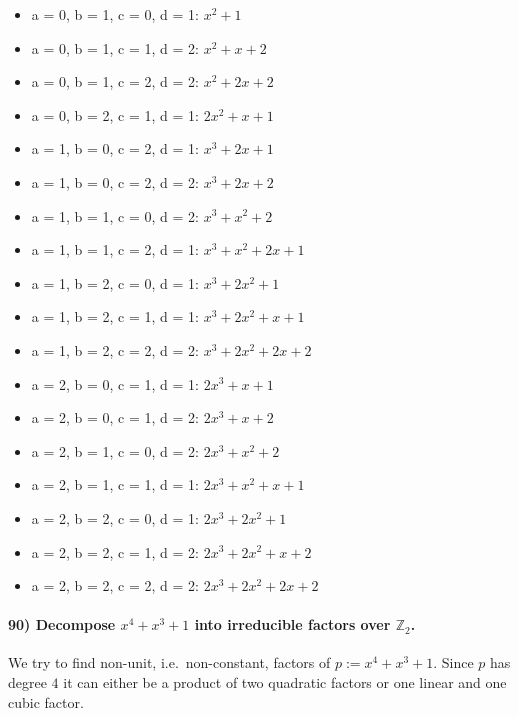\documentclass[
]{article}
\providecommand{\tightlist}{%
  \setlength{\itemsep}{0pt}\setlength{\parskip}{0pt}}
\begin{document}
\begin{itemize}
\tightlist
\item
  a = 0, b = 1, c = 0, d = 1: \(x^2 + 1\)
\item
  a = 0, b = 1, c = 1, d = 2: \(x^2 + x + 2\)
\item
  a = 0, b = 1, c = 2, d = 2: \(x^2 + 2x + 2\)
\item
  a = 0, b = 2, c = 1, d = 1: \(2x^2 + x + 1\)
\item
  a = 1, b = 0, c = 2, d = 1: \(x^3 + 2x + 1\)
\item
  a = 1, b = 0, c = 2, d = 2: \(x^3 + 2x + 2\)
\item
  a = 1, b = 1, c = 0, d = 2: \(x^3 + x^2 + 2\)
\item
  a = 1, b = 1, c = 2, d = 1: \(x^3 + x^2 + 2x + 1\)
\item
  a = 1, b = 2, c = 0, d = 1: \(x^3 + 2x^2 + 1\)
\item
  a = 1, b = 2, c = 1, d = 1: \(x^3 + 2x^2 + x + 1\)
\item
  a = 1, b = 2, c = 2, d = 2: \(x^3 + 2x^2 + 2x + 2\)
\item
  a = 2, b = 0, c = 1, d = 1: \(2x^3 + x + 1\)
\item
  a = 2, b = 0, c = 1, d = 2: \(2x^3 + x + 2\)
\item
  a = 2, b = 1, c = 0, d = 2: \(2x^3 + x^2 + 2\)
\item
  a = 2, b = 1, c = 1, d = 1: \(2x^3 + x^2 + x + 1\)
\item
  a = 2, b = 2, c = 0, d = 1: \(2x^3 + 2x^2 + 1\)
\item
  a = 2, b = 2, c = 1, d = 2: \(2x^3 + 2x^2 + x + 2\)
\item
  a = 2, b = 2, c = 2, d = 2: \(2x^3 + 2x^2 + 2x + 2\)
\end{itemize}

\hypertarget{decompose-x4-x3-1-into-irreducible-factors-over-mathbbz_2.}{%
\paragraph{\texorpdfstring{90) Decompose \(x^4 + x^3 + 1\) into
irreducible factors over
\(\mathbb{Z}_2\).}{90) Decompose x\^{}4 + x\^{}3 + 1 into irreducible factors over \textbackslash mathbb\{Z\}\_2.}}\label{decompose-x4-x3-1-into-irreducible-factors-over-mathbbz_2.}}

We try to find non-unit, i.e.~non-constant, factors of
\(p := x^4 + x^3 + 1\). Since \(p\) has degree \(4\) it can either be a
product of two quadratic factors or one linear and one cubic factor.
\end{document}
